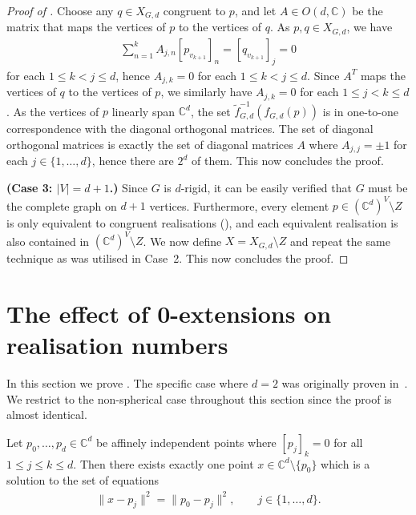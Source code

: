 \documentclass[ALCO]{cedram}
\begin{document}
\begin{proof}[Proof of ]
	Choose any $q \in X_{G,d}$ congruent to $p$,
	and let $A \in O(d,\mathbb{C})$ be the matrix that maps the vertices of $p$ to the vertices of $q$.
	As $p,q \in X_{G,d}$, we have 
	\begin{align*}
		\sum_{n=1}^k A_{j,n} [p_{v_{k+1}}]_n = [q_{v_{k+1}}]_j = 0
	\end{align*}
	for each $1 \leq k < j \leq d$,
	hence $A_{j,k}=0$ for each $1 \leq k < j \leq d$.
	Since $A^T$ maps the vertices of $q$ to the vertices of $p$,
	we similarly have $A_{j,k}=0$ for each $1 \leq j < k \leq d$.
	As the vertices of $p$ linearly span $\mathbb{C}^d$,
	the set $\tilde{f}_{G,d}^{-1}\left(f_{G,d}(p) \right)$ is in one-to-one correspondence with the diagonal orthogonal matrices.
	The set of diagonal orthogonal matrices is exactly the set of diagonal matrices $A$ where $A_{j,j} = \pm 1$ for each $j \in \{1,\ldots, d\}$,
	hence there are $2^d$ of them.
	This now concludes the proof.
	
	\textbf{(Case 3: $|V| =d+1$.)}	
	Since $G$ is $d$-rigid, it can be easily verified that $G$ must be the complete graph on $d+1$ vertices.
	Furthermore,
	every element $p \in (\mathbb{C}^d)^V \setminus Z$ is only equivalent to congruent realisations (\cite[Corollary 8]{Gortler2014}),
	and each equivalent realisation is also contained in $(\mathbb{C}^d)^V \setminus Z$.
	We now define $X = X_{G,d} \setminus Z$ and repeat the same technique as was utilised in Case~2.
	This now concludes the proof.
\end{proof}





\section{The effect of 0-extensions on realisation numbers}
\label{sec:0ext}

In this section we prove .
The specific case where $d=2$ was originally proven in~\cite{BorceaStreinu}.
We restrict to the non-spherical case throughout this section since the proof is almost identical.


\begin{lemma}\label{l:0extvec}
	Let $p_0,\ldots,p_d \in \mathbb{C}^d$ be affinely independent points where $[p_j]_k = 0$ for all $1 \leq j \leq k \leq d$.
	Then there exists exactly one point $x \in \mathbb{C}^d\setminus \{p_0\}$ which is a solution to the set of equations
	\begin{align}\label{eq:0ext1}
		\| x - p_j \|^2 = \| p_0 - p_j \|^2, \qquad j \in \{1,\ldots,d\}.
 	\end{align}
\end{lemma}
\end{document}
